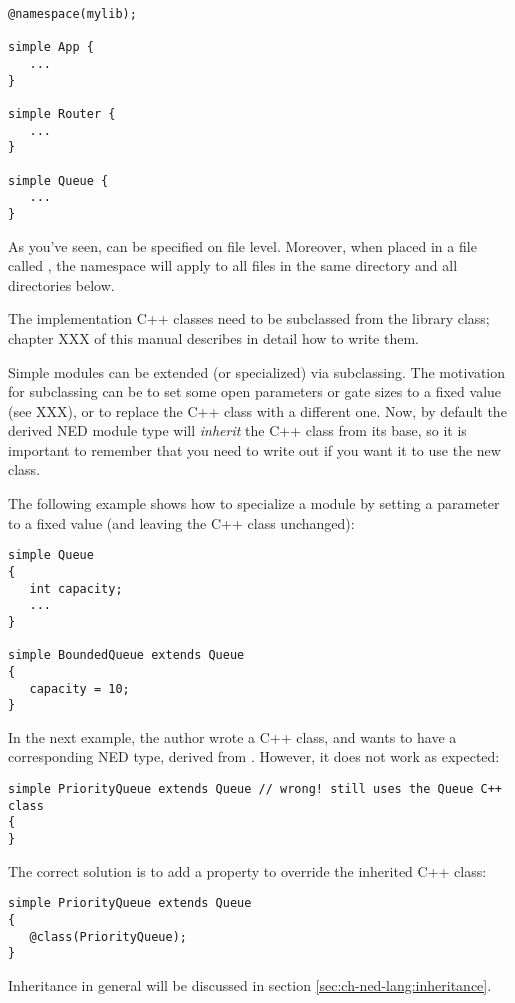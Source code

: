 \begin{Verbatim}
@namespace(mylib);

simple App {
   ...
}

simple Router {
   ...
}

simple Queue {
   ...
}
\end{Verbatim}

As you've seen,  can be specified on file level. Moreover,
when placed in a file called , the namespace will apply to
all files in the same directory and all directories below.

The implementation C++ classes need to be subclassed from the
 library class; chapter XXX of this manual describes
in detail how to write them.

Simple modules can be extended (or specialized) via subclassing.
The motivation for subclassing can be to set some open parameters
or gate sizes to a fixed value (see XXX), or to replace the C++
class with a different one. Now, by default the derived NED module type
will \textit{inherit} the C++ class from its base, so it is important
to remember that you need to write out  if you want it
to use the new class.

The following example shows how to specialize a module by setting a parameter
to a fixed value (and leaving the C++ class unchanged):

\begin{Verbatim}
simple Queue
{
   int capacity;
   ...
}

simple BoundedQueue extends Queue
{
   capacity = 10;
}
\end{Verbatim}

In the next example, the author wrote a  C++ class, and
wants to have a corresponding NED type, derived from . However,
it does not work as expected:

\begin{Verbatim}
simple PriorityQueue extends Queue // wrong! still uses the Queue C++ class
{
}
\end{Verbatim}

The correct solution is to add a  property to override the
inherited C++ class:

\begin{Verbatim}
simple PriorityQueue extends Queue
{
   @class(PriorityQueue);
}
\end{Verbatim}

Inheritance in general will be discussed in section \ref{sec:ch-ned-lang:inheritance}.



